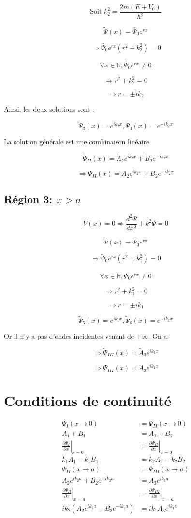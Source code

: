 \documentclass[12pt,a4paper]{article}
\begin{document}
\[\text{Soit } k_2^2 = \frac{2m(E+V_0)}{\hbar^2}\]

\[\tilde{\Psi}(x) = \tilde{\Psi_0}e^{rx}\]

\[\Rightarrow \tilde{\Psi_0}e^{rx}(r^2 + k_2^2) = 0\]

\[\forall x \in \mathbb{R}, \tilde{\Psi_0}e^{rx} \neq 0\]

\[\Rightarrow r^2 + k_2^2 = 0\]

\[\Rightarrow r = \pm ik_2\]

Ainsi, les deux solutions sont :

\[\tilde{\Psi}_3(x) = e^{ik_2x}, \tilde{\Psi}_4(x) = e^{-ik_2x}\]

La solution générale est une combinaison linéaire

\[\tilde{\Psi}_{II}(x) = \tilde{A}_2 e^{ik_2x} + \tilde{B}_2 e^{-ik_2x}\]

\[\Rightarrow \Psi_{II}(x) = A_2 e^{ik_2x} + B_2 e^{-ik_2x}\]

\subsection{Région 3: $x > a$}

\[V(x) = 0 \Rightarrow \frac{d^2\Psi}{dx^2} + k_1^2\Psi = 0\]

\[\tilde{\Psi}(x) = \tilde{\Psi}_0 e^{rx}\]

\[\Rightarrow \tilde{\Psi}_0 e^{rx}(r^2 + k_1^2) = 0\]

\[\forall x \in \mathbb{R}, \tilde{\Psi}_0 e^{rx} \neq 0\]

\[\Rightarrow r^2 + k_1^2 = 0\]

\[\Rightarrow r = \pm ik_1\]

\[\tilde{\Psi}_5(x) = e^{ik_1x}, \tilde{\Psi}_6(x) = e^{-ik_1x}\]

Or il n'y a pas d'ondes incidentes venant de $+\infty$. On a:

\[\Rightarrow \tilde{\Psi}_{III}(x) = \tilde{A}_3 e^{ik_1x}\]

\[\Rightarrow \Psi_{III}(x) = A_3 e^{ik_1x}\]


\section{Conditions de continuité}

\begin{align*}
\Psi_I(x\to0) &= \Psi_{II}(x\to0) \\
A_1 + B_1 &= A_2 + B_2 \\
\left.\frac{\partial \Psi_I}{\partial x}\right|_{x=0} &= \left.\frac{\partial \Psi_{II}}{\partial x}\right|_{x=0} \\
k_1 A_1 - k_1 B_1 &= k_2 A_2 - k_2 B_2 \\
\Psi_{II}(x\to a) &= \Psi_{III}(x\to a) \\
A_2 e^{ik_2a} + B_2 e^{-ik_2a} &= A_3 e^{ik_1a} \\
\left.\frac{\partial \Psi_{II}}{\partial x}\right|_{x=a} &= \left.\frac{\partial \Psi_{III}}{\partial x}\right|_{x=a} \\
ik_2(A_2e^{ik_2a} - B_2e^{-ik_2a}) &= ik_1A_3e^{ik_1a}
\end{align*}
\end{document}
